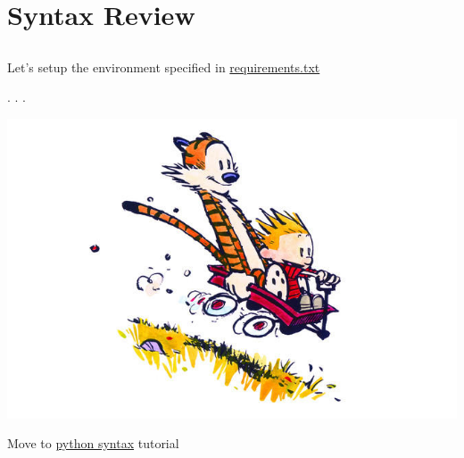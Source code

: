 \documentclass[
  letterpaper,
  DIV=11,
  numbers=noendperiod]{scrartcl}
\begin{document}
\section{Syntax Review}\label{syntax-review}

\subsection{}\label{section}

Let's setup the environment specified in
\href{../requirements.txt}{requirements.txt}

. . .

\includegraphics{graphs/ea0.jpg}

Move to \href{../handson/python_syntax.qmd}{python syntax} tutorial
\end{document}
